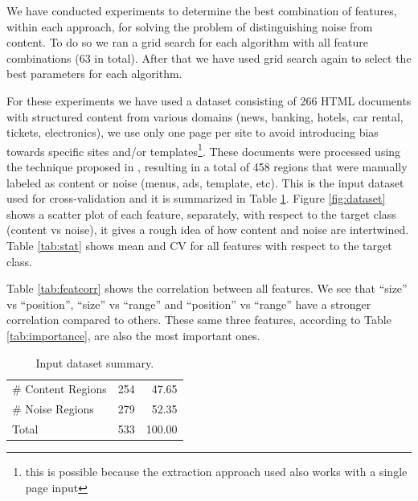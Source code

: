 We have conducted experiments to determine the best combination of features,
within each approach, for solving the problem of distinguishing noise from
content. To do so we ran a grid search for each algorithm with all feature
combinations (63 in total). After that we have used grid search again to select
the best parameters for each algorithm.

For these experiments we have used a dataset consisting of 266 HTML documents
with structured content from various domains (news, banking, hotels, car rental,
tickets, electronics), we use only one page per site to avoid introducing bias
towards specific sites and/or templates\footnote{this is possible because the
extraction approach used also works with a single page input}. These documents
were processed using the technique proposed in
\cite{Velloso:2017:ERW:3132847.3132875}, resulting in a total of 458 regions
that were manually labeled as content or noise (menus, ads, template, etc). This
is the input dataset used for cross-validation and it is summarized in Table
\ref{tab:dataset}. Figure \ref{fig:dataset} shows a scatter plot of each
feature, separately, with respect to the target class (content vs noise), it
gives a rough idea of how content and noise are intertwined. Table
\ref{tab:stat} shows mean and CV for all features with respect to the target
class.

Table \ref{tab:featcorr} shows the correlation between all features. We see that
``size'' vs ``position'', ``size'' vs ``range'' and ``position'' vs ``range''
have a stronger correlation compared to others. These same three features,
according to Table \ref{tab:importance}, are also the most important ones.

 
\begin{table}[h]
\centering
\caption{Input dataset summary.}
\label{tab:dataset}
\begin{tabular}{ | l | l | r |}
\hline
\# Content Regions & 254 & 47.65 \\
\# Noise Regions & 279 & 52.35 \\
\hline
Total & 533 & 100.00 \\
\hline
\end{tabular}
\end{table}

